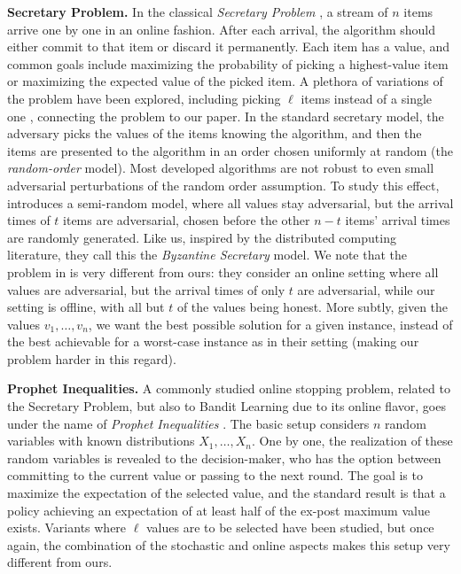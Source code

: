 \noindent \textbf{Secretary Problem.} In the classical \emph{Secretary Problem} \cite{who_solved_secretary, dynkin}, a stream of $n$ items arrive one by one in an online fashion. After each arrival, the algorithm should either commit to that item or discard it permanently. Each item has a value, and common goals include maximizing the probability of picking a highest-value item or maximizing the expected value of the picked item. A plethora of variations of the problem have been explored, including picking $\ell$ items instead of a single one \cite{k_secretary}, connecting the problem to our paper. In the standard secretary model, the adversary picks the values of the items knowing the algorithm, and then the items are presented to the algorithm in an order chosen uniformly at random (the \emph{random-order} model). Most developed algorithms are not robust to even small adversarial perturbations of the random order assumption. To study this effect, \cite{goran} introduces a semi-random model, where all values stay adversarial, but the arrival times of $t$ items are adversarial, chosen before the other $n - t$ items' arrival times are randomly generated. Like us, inspired by the distributed computing literature, they call this the \emph{Byzantine Secretary} model. We note that the problem in \cite{goran} is very different from ours: they consider an online setting where all values are adversarial, but the arrival times of only $t$ are adversarial, while our setting is offline, with all but $t$ of the values being honest. More subtly, given the values $v_1, \dots, v_n$, we want 
the best possible solution for a given instance, instead of the best achievable for a worst-case instance as in their setting (making our problem harder in this regard).

\noindent \textbf{Prophet Inequalities.} A commonly studied online stopping problem, related to the Secretary Problem, but also to Bandit Learning due to its online flavor, goes under the name of \emph{Prophet Inequalities} \cite{prophet}. The basic setup considers $n$ random variables with known distributions $X_1, \dots, X_n$. One by one, the realization of these random variables is revealed to the decision-maker, who has the option between committing to the current value or passing to the next round. The goal is to maximize the expectation of the selected value, and the standard result is that a policy achieving an expectation of at least half of the ex-post maximum value exists. Variants where $\ell$ values are to be selected have been studied, but once again, the combination of the stochastic and online aspects makes this setup very different from ours.